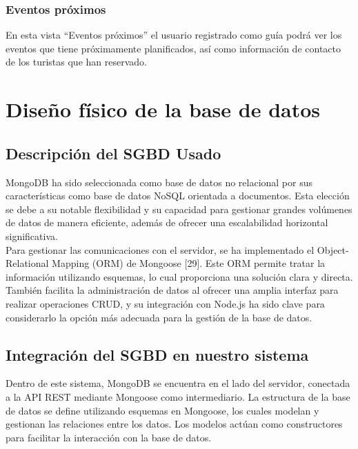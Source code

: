 \subsubsection{Eventos próximos}
En esta vista “Eventos próximos” el usuario registrado como guía podrá ver los eventos que tiene próximamente planificados, así como información de contacto de los turistas que han reservado.


\section{Diseño físico de la base de datos}
\subsection{Descripción del SGBD Usado}
MongoDB \cite{} ha sido seleccionada como base de datos no relacional por sus características como base de datos NoSQL orientada a documentos. Esta elección se debe a su notable flexibilidad y su capacidad para gestionar grandes volúmenes de datos de manera eficiente, además de ofrecer una escalabilidad horizontal significativa.
\\[1ex]
Para gestionar las comunicaciones con el servidor, se ha implementado el Object-Relational Mapping (ORM) de Mongoose [29]. Este ORM permite tratar la información utilizando esquemas, lo cual proporciona una solución clara y directa. También facilita la administración de datos al ofrecer una amplia interfaz para realizar operaciones CRUD, y su integración con Node.js ha sido clave para considerarlo la opción más adecuada para la gestión de la base de datos.
\\[1ex]
\subsection{Integración del SGBD en nuestro sistema}
Dentro de este sistema, MongoDB se encuentra en el lado del servidor, conectada a la API REST mediante Mongoose como intermediario. La estructura de la base de datos se define utilizando esquemas en Mongoose, los cuales modelan y gestionan las relaciones entre los datos. Los modelos actúan como constructores para facilitar la interacción con la base de datos.
\\[1ex]
